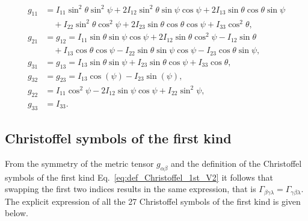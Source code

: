 \documentclass[lineno, pdflatex,sn-mathphys-ay]{sn-jnl}
\theoremstyle{thmstyleone}%
\theoremstyle{thmstyletwo}%
\theoremstyle{thmstylethree}%
\begin{document}
\begin{appendices}
\begin{align}
    g_{11} & = I_{11} \sin^2\theta \sin^2\psi
    + 2 I_{12} \sin^2\theta \sin\psi \cos\psi
    + 2 I_{13} \sin\theta \cos\theta \sin\psi \nonumber \\
    & \quad + I_{22} \sin^2\theta \cos^2\psi
    + 2 I_{23} \sin\theta \cos\theta \cos\psi
    + I_{33} \cos^2\theta, \nonumber \\
    g_{21} &= g_{12}
    = I_{11} \sin\theta \sin\psi \cos\psi
    + 2 I_{12} \sin\theta \cos^2\psi
    - I_{12} \sin\theta \nonumber \\
    & \quad + I_{13} \cos\theta \cos\psi
    - I_{22} \sin\theta \sin\psi \cos\psi
    - I_{23} \cos\theta \sin\psi, \nonumber \\
    g_{31} &= g_{13}
    = I_{13} \sin\theta \sin\psi
    + I_{23} \sin\theta \cos\psi
    + I_{33} \cos\theta, \nonumber \\
	g_{32}  &= g_{23}  = I_{13} \cos(\psi) - I_{23} \sin(\psi), \nonumber \\
    g_{22} & = I_{11} \cos^2\psi
    - 2 I_{12} \sin\psi \cos\psi
    + I_{22} \sin^2\psi, \nonumber \\
    g_{33} & = I_{33}.
\end{align}

\subsection{Christoffel symbols of the first kind} %

From the symmetry of the metric tensor $g_{\alpha\beta}$ and the definition of the Christoffel symbols of the first kind Eq.~\eqref{eq:def_Christoffel_1st_V2} it follows that swapping the first two indices results in the same expression, that is
${\Gamma_{\beta\gamma\lambda} = \Gamma_{\gamma\beta\lambda} }$.
The explicit expression of all the 27 Christoffel symbols of the first kind is given below.


\end{appendices}
\end{document}
